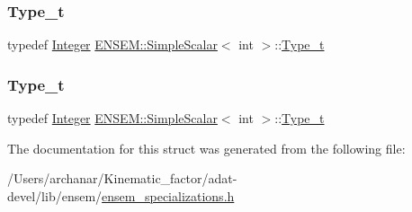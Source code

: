 \mbox{\label{structENSEM_1_1SimpleScalar_3_01int_01_4_a3d6a45a8cd225aba61dd4c2593501d66}} 
\subsubsection{\texorpdfstring{Type\_t}{Type\_t}\hspace{0.1cm}{\footnotesize\ttfamily [2/3]}}
{\footnotesize\ttfamily typedef \mbox{\hyperlink{group__defs_gab13d060149cdd80ab40fd8d653f60117}{Integer}} \mbox{\hyperlink{structENSEM_1_1SimpleScalar}{E\+N\+S\+E\+M\+::\+Simple\+Scalar}}$<$ int $>$\+::\mbox{\hyperlink{structENSEM_1_1SimpleScalar_3_01int_01_4_a3d6a45a8cd225aba61dd4c2593501d66}{Type\+\_\+t}}}

\mbox{\label{structENSEM_1_1SimpleScalar_3_01int_01_4_a3d6a45a8cd225aba61dd4c2593501d66}} 
\subsubsection{\texorpdfstring{Type\_t}{Type\_t}\hspace{0.1cm}{\footnotesize\ttfamily [3/3]}}
{\footnotesize\ttfamily typedef \mbox{\hyperlink{group__defs_gab13d060149cdd80ab40fd8d653f60117}{Integer}} \mbox{\hyperlink{structENSEM_1_1SimpleScalar}{E\+N\+S\+E\+M\+::\+Simple\+Scalar}}$<$ int $>$\+::\mbox{\hyperlink{structENSEM_1_1SimpleScalar_3_01int_01_4_a3d6a45a8cd225aba61dd4c2593501d66}{Type\+\_\+t}}}



The documentation for this struct was generated from the following file\+:\begin{DoxyCompactItemize}
\item 
/\+Users/archanar/\+Kinematic\+\_\+factor/adat-\/devel/lib/ensem/\mbox{\hyperlink{adat-devel_2lib_2ensem_2ensem__specializations_8h}{ensem\+\_\+specializations.\+h}}\end{DoxyCompactItemize}
